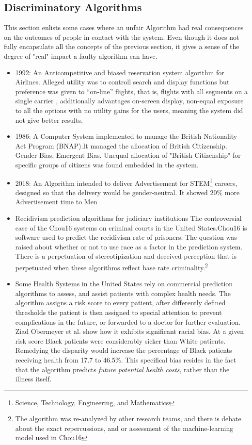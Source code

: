 \subsection{Discriminatory Algorithms}
\label{discexamples}
This section enlists some cases where an unfair Algorithm had real consequences on the outcomes of people in contact with the system. Even though it does not fully encapsulate all the concepts of the previous section, it gives a sense of the degree of "real" impact a faulty algorithm can have.
\begin{itemize}
  \item 1992: An Anticompetitive and biased reservation system algorithm for Airlines. Alleged utility was to controll search and display functions but preference was given to “on-line” flights, that is, flights with all segments on a single carrier \cite{Compsysbias}, additionally advantages on-screen display, non-equal exposure to all the options with no utility gains for the users, meaning the system did not give better results.
  \item 1986: A Computer System implemented to manage the British Nationality Act Program (BNAP).It managed the allocation of British Citizenship. Gender Bias, Emergent Bias. Unequal allocation of "British Citizenship" for specific groups of citizens was found embedded in the system.\cite{Compsysbias}
  \item 2018: An Algorithm intended to deliver Advertisement for STEM\footnote{Science, Technology, Engineering, and Mathematics} careers, designed so that the delivery would be gender-neutral. It showed 20\% more Advertisement time to Men \cite{LaTu16}
  \item Recidivism prediction algorithms for judiciary institutions \cite{AyCr18} \cite{DrFa18}
  The controversial case of the Chou16 systems on criminal courts in the United States.Chou16 is software used to predict the recidivism rate of prisoners. The question was raised about whether or not to use race as a factor in the prediction system. \\
  There is a perpetuation of stereotipization and deceived perception that is perpetuated when these algorithms reflect base rate criminality.\footnote{The algorithm was re-analyzed by other research teams, and there is debate about the exact repercussions, and or assessment of the machine-learning model used in Chou16}
  \item Some Health Systems in the United States rely on commercial prediction algorithms to assess, and assist patients with complex health needs. The algorithm assigns a risk score to every patient, after differently defined thresholds the patient is then assigned to special attention to prevent complications in the future, or forwarded to a doctor for further evaluation.  Ziad Obermeyer et al. show how it exhibits significant racial bias\cite{OPVM19}. At a given risk score Black patients were considerably sicker than White patients. Remedying the disparity would increase the percentage of Black patients receiving health from 17.7 to 46.5\%. This specifical bias resides in the fact that the algorithm predicts \textsl{future potential health costs}, rather than the illness itself.



\end{itemize}
